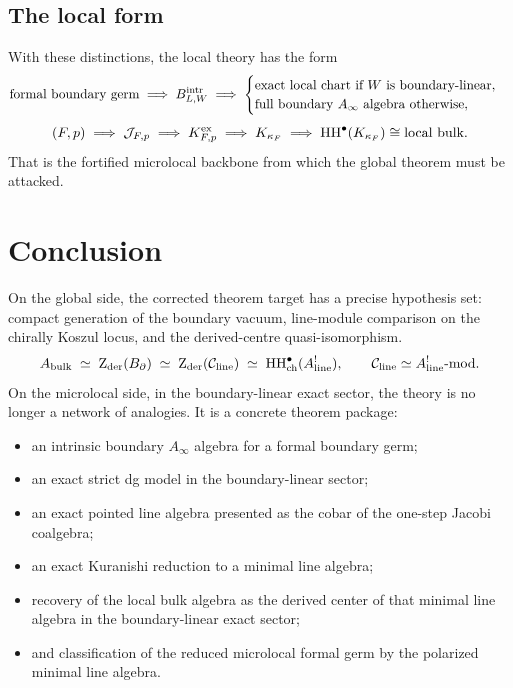 \subsection*{The local form}

With these distinctions, the local theory has the form
\[
\text{formal boundary germ}
\;\Longrightarrow\;
B^{\mathrm{intr}}_{L,W}
\;\Longrightarrow\;
\begin{cases}
\text{exact local chart if $W$ is boundary-linear},\\
\text{full boundary $A_\infty$ algebra otherwise},
\end{cases}
\]
\[
(F,p)
\;\Longrightarrow\;
\mathcal J_{F,p}
\;\Longrightarrow\;
K^{\mathrm{ex}}_{F,p}
\;\Longrightarrow\;
K_{\kappa_F}
\;\Longrightarrow\;
\operatorname{HH}^\bullet(K_{\kappa_F})\cong \text{local bulk}.
\]
That is the fortified microlocal backbone from which the global theorem must be attacked.


\section{Conclusion}


On the global side, the corrected theorem target has a precise
hypothesis set: compact generation of the boundary vacuum,
line-module comparison on the chirally Koszul locus, and the
derived-centre quasi-isomorphism.
\[
A_{\mathrm{bulk}}
\;\simeq\;
\operatorname{Z}_{\mathrm{der}}(B_{\partial})
\;\simeq\;
\operatorname{Z}_{\mathrm{der}}(\mathcal C_{\mathrm{line}})
\;\simeq\;
\operatorname{HH}^\bullet_{\mathrm{ch}}(A^!_{\mathrm{line}}),
\qquad
\mathcal C_{\mathrm{line}}\simeq A^!_{\mathrm{line}}\text{-mod}.
\]
On the microlocal side, in the boundary-linear exact sector, the
theory is no longer a network of analogies. It is a concrete
theorem package:
\begin{itemize}[leftmargin=1.8em]
\item an intrinsic boundary $A_\infty$ algebra for a formal boundary germ;
\item an exact strict dg model in the boundary-linear sector;
\item an exact pointed line algebra presented as the cobar of the one-step Jacobi coalgebra;
\item an exact Kuranishi reduction to a minimal line algebra;
\item recovery of the local bulk algebra as the derived center of that minimal line algebra in the boundary-linear exact sector;
\item and classification of the reduced microlocal formal germ by the polarized minimal line algebra.
\end{itemize}

